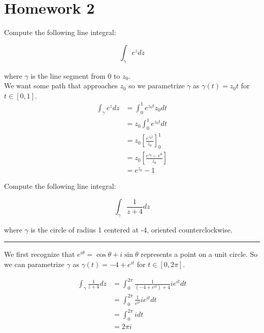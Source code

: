 \chapter{Homework 2}

\begin{example}

    Compute the following line integral:

    $$\int_\gamma e^zdz$$

    where $\gamma$ is the line segment from 0 to $z_0.$\\

    We want some path that approaches $z_0$ so we parametrize $\gamma$ as $\gamma(t) = z_0t$ for $t \in [0,1]$.
    \begin{align*}
        \int_\gamma e^zdz & = \int_0^1 e^{z_0t}z_0dt                     \\
                          & = z_0 \int_0^1 e^{z_0t}dt                    \\
                          & = z_0 \left[\frac{e^{z_0t}}{z_0}\right]_0^1  \\
                          & = z_0 \left[\frac{e^{z_0} - e^0}{z_0}\right] \\
                          & = e^{z_0} - 1
    \end{align*}
\end{example}


\begin{example}

    Compute the following line integral:

    $$\int_\gamma\frac1{z+4}dz$$

    where $\gamma$ is the circle of radius 1 centered at -4, oriented counterclockwise.\\

    \hrule
    \vspace{0.5cm}

    We first recognize that $e^{i\theta} = \cos\theta + i\sin\theta$ represents a point on a unit circle. So we can parametrize $\gamma$ as $\gamma(t) = -4 + e^{it}$ for $t \in [0,2\pi]$.

    \begin{align*}
        \int_\gamma\frac1{z+4}dz & = \int_0^{2\pi}\frac{1}{(-4 + e^{it})+4}ie^{it}dt \\
                                 & = \int_0^{2\pi}\frac{1}{e^{it}}ie^{it}dt          \\
                                 & = \int_0^{2\pi}idt                                \\
                                 & = 2\pi i
    \end{align*}

\end{example}

